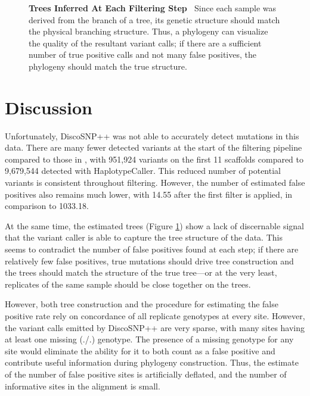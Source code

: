 \documentclass{article}
\newcommand{\titlecaption}[2]{\caption[#1]{\textbf{#1 \textbar\,} #2}}
\begin{document}
\begin{figure}
\begin{tabularx}{\textwidth}{ >{\hsize=.5\hsize\linewidth=\hsize}X >{\hsize=1.5\hsize\linewidth=\hsize}X | >{\hsize=.5\hsize\linewidth=\hsize}X >{\hsize=1.5\hsize\linewidth=\hsize}X }
\bottomrule
\end{tabularx}
\titlecaption{Trees Inferred At Each Filtering Step}{Since each sample was derived from the branch of a tree, its genetic structure should match the physical branching structure. Thus, a phylogeny can visualize the quality of the resultant variant calls; if there are a sufficient number of true positive calls and not many false positives, the phylogeny should match the true structure.}
\label{fig:ev_filtertrees}
\end{figure}

\section{Discussion}
\begin{outline}
	\item Unfortunately, DiscoSNP++ was not able to accurately detect mutations in this data. There are many fewer detected variants at the start of the filtering pipeline compared to those in \cite{orr_phylogenomic_2020}, with 951,924 variants on the first 11 scaffolds compared to 9,679,544 detected with HaplotypeCaller. This reduced number of potential variants is consistent throughout filtering. However, the number of estimated false positives also remains much lower, with 14.55 after the first filter is applied, in comparison to 1033.18.

	\item At the same time, the estimated trees (Figure \ref{fig:ev_filtertrees}) show a lack of discernable signal that the variant caller is able to capture the tree structure of the data. This seems to contradict the number of false positives found at each step; if there are relatively few false positives, true mutations should drive tree construction and the trees should match the structure of the true tree---or at the very least, replicates of the same sample should be close together on the trees.

	\item However, both tree construction and the procedure for estimating the false positive rate rely on concordance of all replicate genotypes at every site. However, the variant calls emitted by DiscoSNP++ are very sparse, with many sites having at least one missing (./.) genotype. The presence of a missing genotype for any site would eliminate the ability for it to both count as a false positive and contribute useful information during phylogeny construction. Thus, the estimate of the number of false positive sites is artificially deflated, and the number of informative sites in the alignment is small. 


\end{outline}
\end{document}

